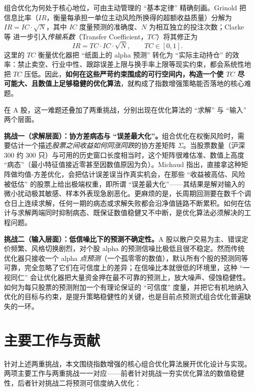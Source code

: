 组合优化为何处于核心地位，可由主动管理的 ``基本定律'' 精确刻画。Grinold\cite{Grinold1989} 把信息比率（$IR$，衡量每承担一单位主动风险所换得的超额收益质量）分解为 $IR = IC\cdot\sqrt{N}$，其中 $IC$ 度量预测的准确度、$N$ 为相互独立的投注次数；Clarke 等\cite{Clarke2002} 进一步引入\emph{传输系数}（Transfer Coefficient，$TC$）将其修正为
\begin{equation}
IR = TC\cdot IC\cdot\sqrt{N},\qquad TC\in[0,1].
\end{equation}
这里的 $TC$ 衡量优化器把 ``纸面上的 alpha 预测'' 转化为 ``实际主动持仓'' 的效率：禁止卖空、行业中性、跟踪误差上限与换手率上限等现实约束，都会系统性地把 $TC$ 压低\cite{Grinold2000,Ding2017}。因此，\textbf{如何在这些严苛约束围成的可行空间内，构造一个使 $TC$ 尽可能大、且数值上足够稳健的优化算法}，就构成了指数增强策略能否落地的核心难题。

在 A 股，这一难题还叠加了两重挑战，分别出现在优化算法的 ``求解'' 与 ``输入'' 两个层面。

\textbf{挑战一（求解层面）：协方差病态与 ``误差最大化''。}组合优化在权衡风险时，需要估计一个描述\emph{股票之间收益如何同涨同跌}的协方差矩阵 $\Sigma$。当股票数量（沪深 300 约 300 只）与可用的历史窗口长度相当时，这个矩阵很难估准、数值上高度 ``病态''（最小特征值接近零甚至因数值原因为负）。Michaud\cite{Michaud1989} 指出，直接拿这种矩阵做均值-方差优化，会把估计误差误当作真实机会，在那些 ``收益被高估、风险被低估'' 的股票上给出极端权重，即所谓 ``误差最大化''——其结果是解对输入的微小扰动极其敏感、样本外表现急剧恶化。更麻烦的是，长周期回测要在数千个调仓日上连续求解，任何一期的病态或求解失败都会沿净值链路不断累积。如何在估计与求解两端同时抑制病态、既保证数值稳健又不中断，是优化算法必须解决的工程问题。

\textbf{挑战二（输入层面）：低信噪比下的预测不确定性。}A 股以散户交易为主、错误定价频繁、风格切换剧烈，对个股 alpha 的预测信噪比极低且很不稳定。然而传统优化器只接收一个 alpha \emph{点预测}（一个孤零零的数值），默认所有个股的预测同等可靠，完全忽略了它们在可信度上的差异；在信噪比本就很低的环境里，这种 ``一视同仁'' 会让优化器把大量资金押在最不可靠的预测上，放大噪声、侵蚀稳健性。如何为每只股票的预测附加一个有理论保证的 ``可信度'' 度量，并把它有机地纳入优化的目标与约束，是提升策略稳健性的关键，也是目前点预测式组合优化普遍缺失的一环。

\section{主要工作与贡献}
\label{sec:contributions}

针对上述两重挑战，本文围绕指数增强的核心组合优化算法展开优化设计与实现。两项主要工作与两重挑战一一对应——前者针对挑战一夯实优化算法的数值稳健性，后者针对挑战二将预测可信度纳入优化：

